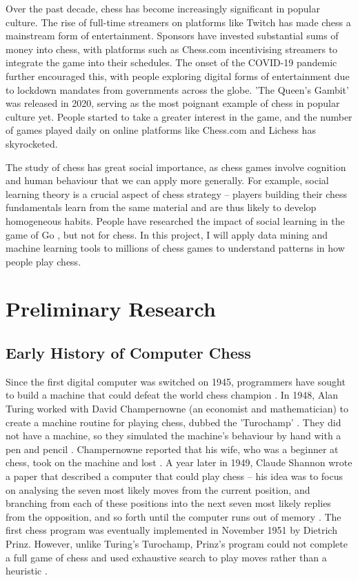 \documentclass[%
 superscriptaddress,
showpacs,preprintnumbers,
 amsmath,
 amssymb,
 aps,
 pra,
showkeys,
onecolumn,
notitlepage,
11pt,
tightenlines      %
]{revtex4-1}
\begin{document}
Over the past decade, chess has become increasingly significant in popular culture. The rise of full-time streamers on platforms like Twitch has made chess a mainstream form of entertainment. Sponsors have invested substantial sums of money into chess, with platforms such as Chess.com incentivising streamers to integrate the game into their schedules. The onset of the COVID-19 pandemic further encouraged this, with people exploring digital forms of entertainment due to lockdown mandates from governments across the globe. 'The Queen's Gambit' was released in 2020, serving as the most poignant example of chess in popular culture yet. People started to take a greater interest in the game, and the number of games played daily on online platforms like Chess.com and Lichess has skyrocketed. 

The study of chess has great social importance, as chess games involve cognition and human behaviour that we can apply more generally. For example, social learning theory is a crucial aspect of chess strategy -- players building their chess fundamentals learn from the same material and are thus likely to develop homogeneous habits. People have researched the impact of social learning in the game of Go \cite{beheim2014strategic}, but not for chess. In this project, I will apply data mining and machine learning tools to millions of chess games to understand patterns in how people play chess.

\section{Preliminary Research}

\subsection{Early History of Computer Chess}
Since the first digital computer was switched on 1945, programmers have sought to build a machine that could defeat the world chess champion \cite{earlyComputerChessHistory}. In 1948, Alan Turing worked with David Champernowne (an economist and mathematician) to create a machine routine for playing chess, dubbed the 'Turochamp' \cite{copeland2005turing}. They did not have a machine, so they simulated the machine's behaviour by hand with a pen and pencil \cite{copeland2005turing}. Champernowne reported that his wife, who was a beginner at chess, took on the machine and lost \cite{copeland2005turing}. A year later in 1949, Claude Shannon wrote a paper that described a computer that could play chess -- his idea was to focus on analysing the seven most likely moves from the current position, and branching from each of these positions into the next seven most likely replies from the opposition, and so forth until the computer runs out of memory \cite{shannon1950xxii}. The first chess program was eventually implemented in November 1951 by Dietrich Prinz. However, unlike Turing's Turochamp, Prinz's program could not complete a full game of chess and used exhaustive search to play moves rather than a heuristic \cite{copeland2005turing}.
\end{document}
